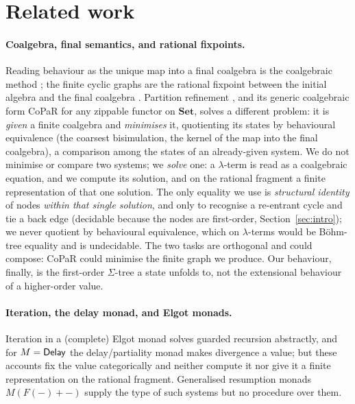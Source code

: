 \section{Related work}\label{sec:related}
\paragraph{Coalgebra, final semantics, and rational fixpoints.}
Reading behaviour as the unique map into a final coalgebra is the coalgebraic method
; the finite cyclic graphs are the rational fixpoint between the initial
algebra and the final coalgebra . Partition refinement
, and its generic coalgebraic form CoPaR  for any zippable functor on $\mathbf{Set}$, solves a different
problem: it is \emph{given} a finite coalgebra and \emph{minimises} it, quotienting its states by
behavioural equivalence (the coarsest bisimulation, the kernel of the map into the final coalgebra),
a comparison among the states of an already-given system. We do not minimise or compare two systems; we
\emph{solve} one: a $\lambda$-term is read as a coalgebraic equation, and we compute its solution, and on
the rational fragment a finite representation of that one solution. The only equality we use is
\emph{structural identity} of nodes \emph{within that single solution}, and only to recognise a
re-entrant cycle and tie a back edge (decidable because the nodes are first-order,
Section~\ref{sec:intro}); we never quotient by behavioural equivalence, which on $\lambda$-terms would be
B\"ohm-tree equality and is undecidable. The two tasks are orthogonal and could compose: CoPaR could
minimise the finite graph we produce. Our behaviour, finally, is the first-order $\Sigma$-tree a state
unfolds to, not the extensional behaviour of a higher-order value.

\paragraph{Iteration, the delay monad, and Elgot monads.}
Iteration in a (complete) Elgot monad
 solves guarded recursion abstractly, and for
$M = \mathsf{Delay}$ the delay/partiality monad  makes divergence a value; but these
accounts fix the value categorically and neither compute it nor give it a finite representation on
the rational fragment. Generalised resumption monads $M(F(-) + -)$  supply the
type of such systems but no procedure over them.


